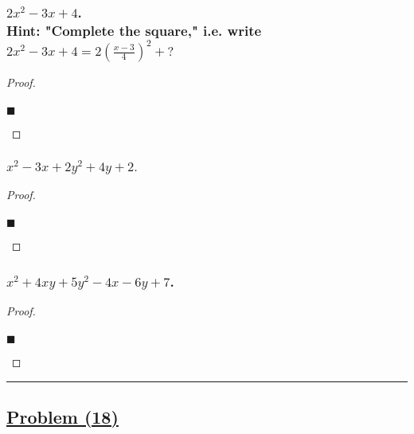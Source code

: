 \documentclass[letterpaper, 10 pt, conference]{ieeeconf}  %
\begin{document}
\subsubsection{\textbf{$2x^2 - 3x + 4$. \\ Hint: "Complete the square," i.e. write $2x^2 - 3x + 4 = 2(\frac{x - 3}{4})^2 + ?$}}

\begin{proof}
\begin{align}
    
\end{align}
\begin{flushright}
$\blacksquare$
\end{flushright}
\end{proof}

\subsubsection{\textbf{$x^2 - 3x + 2y^2 + 4y +2.$}}

\begin{proof}
\begin{align}
    
\end{align}
\begin{flushright}
$\blacksquare$
\end{flushright}
\end{proof}

\subsubsection{\textbf{$x^2 + 4xy + 5y^2 - 4x - 6y + 7$.}}

\begin{proof}
\begin{align}
    
\end{align}
\begin{flushright}
$\blacksquare$
\end{flushright}
\end{proof}

\noindent\rule{8cm}{0.4pt}
\subsection{\textbf{\underline{Problem (18)}}}
\end{document}
